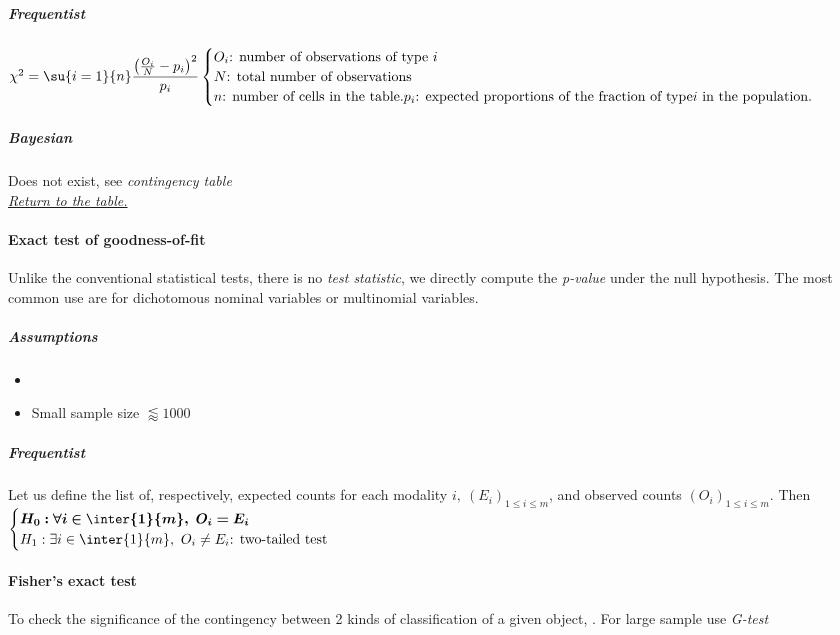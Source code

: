 \subparagraph{Frequentist}
$\chi^{2} = \su{i=1}{n}\dfrac{\left(\frac{O_{i}}{N} - p_{i} \right)^{2}}{p_{i}}
\begin{cases}
    O_{i}\text{: number of observations of type }i \\
    N\text{: total number of observations}\\
    n\text{: number of cells in the table.}
    p_{i}\text{: expected proportions of the fraction of type}i\text{ in the population.}
\end{cases}
$

\subparagraph{Bayesian}
Does not exist, see \emph{contingency table}\\

\textit{\hyperref[statistical_method_table]{Return to the table.}}


\paragraph{Exact test of goodness-of-fit}
Unlike the conventional statistical tests, there is no \emph{test statistic}, we directly
compute the \emph{p-value} under the null hypothesis.
The most common use are for dichotomous nominal variables or multinomial variables.

\subparagraph{Assumptions}
\begin{itemize}
    \item {}
    \item Small sample size $\lessapprox 1000$
\end{itemize}

\subparagraph{Frequentist}
Let us define the list of, respectively, expected counts for each modality 
$i,~(E_{i})_{1\leq i\leq m}$, and observed counts $(O_{i})_{1\leq i\leq m}$.
Then
$\begin{cases}
    \bm{H_{0}: \forall i\in \inter{1}{m},~O_{i} = E_{i}}\\
    H_{1}: \exists i\in \inter{1}{m},~O_{i} \neq E_{i}\text{: two-tailed test} \\
\end{cases}$




\paragraph{Fisher's exact test}
To check the significance of the contingency between 2 kinds of classification of a given
object, . For large sample use \emph{G-test}

